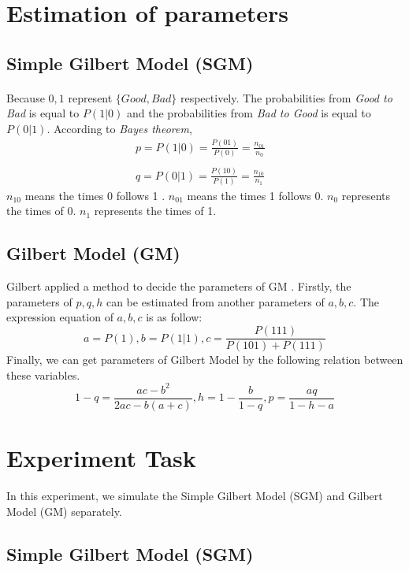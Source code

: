 \documentclass[11pt]{article}
\begin{document}
\section{Estimation of parameters}
\subsection{Simple Gilbert Model (SGM)}
\paragraph{}
Because $0,1$ represent $\{Good,Bad\}$ respectively. The probabilities from \emph{Good to Bad} is equal to $P(1|0)$ and 
the probabilities from \emph{Bad to Good} is equal to $P(0|1)$. According to \emph{Bayes theorem}, 
\begin{equation}
    \begin{array}{lr}
    p = P(1|0) = \frac{P(01)}{P(0)} = \frac{n_{01}}{n_0} &\\ \\
    q = P(0|1) = \frac{P(10)}{P(1)} = \frac{n_{10}}{n_1}
    \end{array}
\end{equation}
$n_{10}$ means the times 0 follows 1 . $n_{01}$ means the times 1 follows 0. $n_0$ represents the times of 0. $n_1$ represents the times of 1.
\subsection{Gilbert Model (GM)}
Gilbert applied a method to decide the parameters of GM \cite{Gilbert Model}.
Firstly, the parameters of ${p,q,h}$ can be estimated from another parameters of ${a,b,c}$. 
The expression equation of ${a,b,c}$ is as follow:
\begin{equation}\label{abc}
    a=P(1), b=P(1 | 1), c=\frac{P(111)}{P(101)+P(111)}
\end{equation}
Finally, we can get parameters of Gilbert Model by the following relation between these variables.
\begin{equation}\label{pqh}
    1-q=\frac{a c-b^{2}}{2 a c-b(a+c)}, h=1-\frac{b}{1-q}, p=\frac{a q}{1-h-a}
\end{equation}

\section{Experiment Task}
In this experiment, we simulate the Simple Gilbert Model (SGM) and Gilbert Model (GM) separately.
\subsection{Simple Gilbert Model (SGM)}
\end{document}
